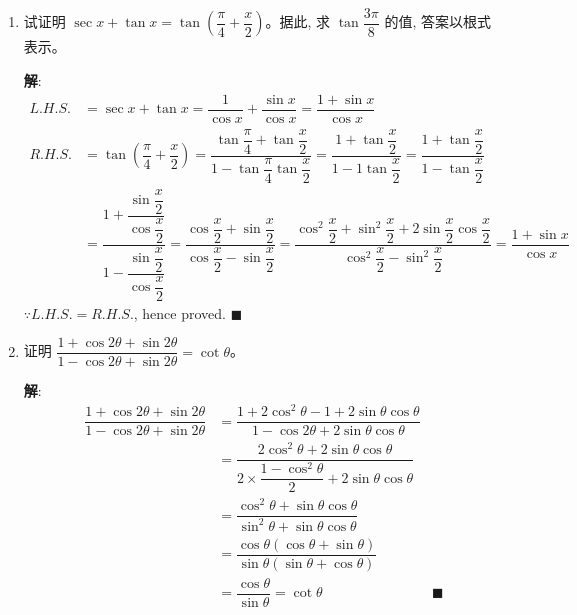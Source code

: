 \documentclass{report}
\newcommand{\sol}{\vspace{0.2cm}\textbf{解}:}
\begin{document}
\begin{enumerate}[leftmargin=*]
        \sol{}
        \begin{align*}
            32 \cos ^4 15^{\circ}-32 \cos ^2 15^{\circ}+4 &= 4(8\cos^4 15^{\circ} - 8\cos^2 15^{\circ} + 1)\\
            & = 4\cos 60^{\circ} \\
            &= 2 & \blacksquare
        \end{align*}

        \item 试证明 $\sec x+\tan x=\tan \left(\dfrac{\pi}{4}+\dfrac{x}{2}\right)$。据此, 求 $\tan \dfrac{3 \pi}{8}$ 的值, 答案以根式表示。
        
        \sol{}
        \begin{align*}
            L.H.S. &= \sec x + \tan x = \dfrac{1}{\cos x} + \dfrac{\sin x}{\cos x} = \dfrac{1+\sin x}{\cos x}\\
            R.H.S. &= \tan\left(\dfrac{\pi}{4} + \dfrac{x}{2}\right) = \dfrac{\tan\dfrac{\pi}{4} + \tan\dfrac{x}{2}}{1 - \tan\dfrac{\pi}{4}\tan\dfrac{x}{2}} = \dfrac{1 + \tan\dfrac{x}{2}}{1 - 1\tan\dfrac{x}{2}} = \dfrac{1 + \tan\dfrac{x}{2}}{1 - \tan\dfrac{x}{2}}\\
            & = \dfrac{1 + \dfrac{\sin\dfrac{x}{2}}{\cos\dfrac{x}{2}}}{1 - \dfrac{\sin\dfrac{x}{2}}{\cos\dfrac{x}{2}}} = \dfrac{\cos\dfrac{x}{2} + \sin\dfrac{x}{2}}{\cos\dfrac{x}{2} - \sin\dfrac{x}{2}} = \dfrac{\cos^2\dfrac{x}{2} + \sin^2\dfrac{x}{2} + 2\sin\dfrac{x}{2}\cos\dfrac{x}{2}}{\cos^2\dfrac{x}{2} - \sin^2\dfrac{x}{2}} = \dfrac{1 + \sin x}{\cos x}
        \end{align*}
        $\because L.H.S. = R.H.S.$, hence proved. \hfill $\blacksquare$

        \item 证明 $\dfrac{1+\cos 2 \theta+\sin 2 \theta}{1-\cos 2 \theta+\sin 2 \theta}=\cot \theta$。
        
        \sol{}
        \begin{align*}
            \dfrac{1+\cos 2 \theta+\sin 2 \theta}{1-\cos 2 \theta+\sin 2 \theta} &= \dfrac{1 + 2\cos^2\theta - 1 + 2\sin\theta\cos\theta}{1 - \cos 2\theta + 2\sin\theta\cos\theta}\\
            &= \dfrac{2\cos^2\theta + 2\sin\theta\cos\theta}{2\times\dfrac{1 - \cos^2\theta}{2} + 2\sin\theta\cos\theta}\\
            &= \dfrac{\cos^2\theta + \sin\theta\cos\theta}{\sin^2\theta + \sin\theta\cos\theta}\\
            &= \dfrac{\cos\theta(\cos\theta + \sin\theta)}{\sin\theta(\sin\theta + \cos\theta)}\\
            &= \dfrac{\cos\theta}{\sin\theta} = \cot\theta & \blacksquare
        \end{align*}


\end{enumerate}
\end{document}
